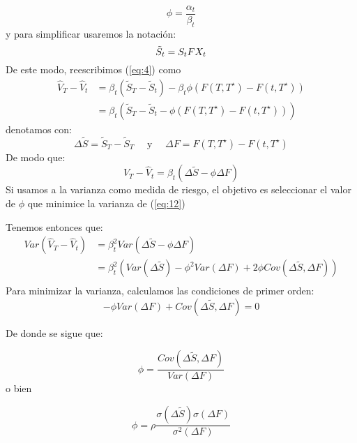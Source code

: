 \documentclass[12pt]{article}
\begin{document}
\begin{equation}
    \phi = \frac{\alpha_t}{\beta_t}
    \label{eq:8}
\end{equation}
y para simplificar usaremos la notación:
\begin{equation}
    \Tilde{S}_t = S_tFX_t
    \label{eq:9}
\end{equation}
De este modo, reescribimos (\ref{eq:4}) como
\begin{equation}
    \begin{split}
            \hat{V}_T - \hat{V}_t  & = \beta_t\left(\tilde{S}_T - \tilde{S}_t\right) - \beta_t\phi\left(F(T, T^\star) - F(t, T^\star)\right) \\
            & = \beta_t\left(\tilde{S}_T - \tilde{S}_t - \phi\left(F(T, T^\star) - F(t, T^\star)\right)\right)
    \end{split}
    \label{eq:10}
\end{equation}
denotamos con:
\begin{equation}
    \Delta \tilde{S} = \tilde{S}_T - \tilde{S}_T \quad \text{ y } \quad \Delta F = F(T, T^\star) - F(t, T^\star)
    \label{eq:11}
\end{equation}
De modo que:
\begin{equation}
    \hat{V}_T - \hat{V}_t = \beta_t\left(\Delta\tilde{S} - \phi\Delta F\right)
    \label{eq:12}
\end{equation}
Si usamos a la varianza como medida de riesgo, el objetivo es seleccionar el valor de $\phi$ que minimice la varianza de (\ref{eq:12})

Tenemos entonces que:
\begin{equation}
	\begin{split}
		Var\left(\hat{V}_T - \hat{V}_t\right) & = \beta^2_tVar\left(\Delta\tilde{S} - \phi\Delta F\right) \\ 
		                                      & = \beta^2_t \left(Var(\Delta\tilde{S}) - \phi^2Var(\Delta F) +2 \phi Cov(\Delta \tilde{S},\Delta F)\right) \\ 
	\end{split}
	\label{eq:13}
\end{equation}
Para minimizar la varianza, calculamos las condiciones de primer orden: 
\begin{equation}
	-\phi Var(\Delta F) +Cov(\Delta \tilde{S},\Delta F) = 0
	\label{eq:14}
\end{equation}

De donde se sigue que:

\begin{equation}
	\phi = \frac{Cov(\Delta \tilde{S},\Delta F)}{Var(\Delta F)} 
	\label{eq:15}
\end{equation}
o bien

\begin{equation}
	\phi = \rho\frac{\sigma(\Delta \tilde{S})\sigma(\Delta F)}{\sigma^2(\Delta F)} 
	\label{eq:15}
\end{equation}
\end{document}
